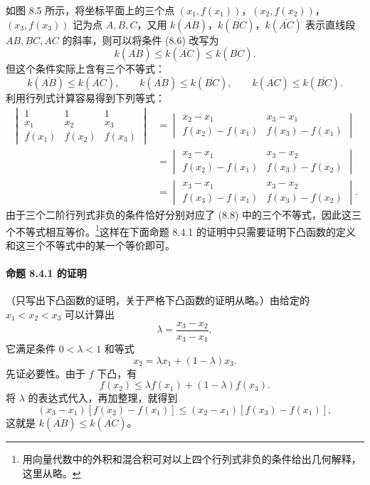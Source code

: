 如图 8.5 所示，将坐标平面上的三个点 $(x_1,f(x_1))$，$(x_2,f(x_2))$，$(x_3,f(x_3))$ 记为点 $A,B,C$，又用 $k(\overline{AB})$，$k(\overline{BC})$，$k(\overline{AC})$ 表示直线段 $AB,BC,AC$ 的斜率，则可以将条件 (8.6) 改写为
\begin{equation}
  k(\overline{AB})\le k(\overline{AC})\le k(\overline{BC}).
  \tag{8.7}
  \label{eq:8.7}
\end{equation}
但这个条件实际上含有三个不等式：
\begin{equation}
  k(\overline{AB})\le k(\overline{AC}),\qquad
  k(\overline{AB})\le k(\overline{BC}),\qquad
  k(\overline{AC})\le k(\overline{BC}).
  \tag{8.8}
  \label{eq:8.8}
\end{equation}
利用行列式计算容易得到下列等式：
\begin{align*}
\begin{vmatrix}
1&1&1\\
x_1&x_2&x_3\\
f(x_1)&f(x_2)&f(x_3)
\end{vmatrix}
&=
\begin{vmatrix}
x_2-x_1&x_3-x_1\\
f(x_2)-f(x_1)&f(x_3)-f(x_1)
\end{vmatrix}\\
&=
\begin{vmatrix}
x_2-x_1&x_3-x_2\\
f(x_2)-f(x_1)&f(x_3)-f(x_2)
\end{vmatrix}\\
&=
\begin{vmatrix}
x_3-x_1&x_3-x_2\\
f(x_3)-f(x_1)&f(x_3)-f(x_2)
\end{vmatrix}.
\end{align*}
由于三个二阶行列式非负的条件恰好分别对应了 (8.8) 中的三个不等式，因此这三个不等式相互等价。\footnote{用向量代数中的外积和混合积可对以上四个行列式非负的条件给出几何解释，这里从略。}这样在下面命题 8.4.1 的证明中只需要证明下凸函数的定义和这三个不等式中的某一个等价即可。

\paragraph{命题 8.4.1 的证明}
（只写出下凸函数的证明，关于严格下凸函数的证明从略。）由给定的 $x_1<x_2<x_3$ 可以计算出
\[
  \lambda=\frac{x_3-x_2}{x_3-x_1},
\]
它满足条件 $0<\lambda<1$ 和等式
\[
  x_2=\lambda x_1+(1-\lambda)x_3.
\]
先证必要性。由于 $f$ 下凸，有
\[
  f(x_2)\le\lambda f(x_1)+(1-\lambda)f(x_3).
\]
将 $\lambda$ 的表达式代入，再加整理，就得到
\[
  (x_3-x_1)[f(x_2)-f(x_1)]\le(x_2-x_1)[f(x_3)-f(x_1)],
\]
这就是 $k(\overline{AB})\le k(\overline{AC})$。

